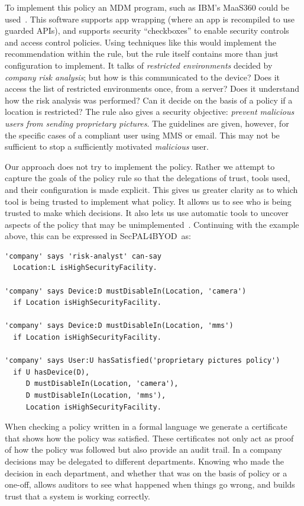\documentclass{llncs}
\newcommand{\AppPAL}[0]{SecPAL4BYOD}
\begin{document}
To implement this policy an \ac{MDM} program, such as IBM's MaaS360 could be used~\cite{_ibm_????}.
This software supports app wrapping (where an app is recompiled to use guarded APIs), and supports security ``checkboxes'' to enable security controls and access control policies.
Using techniques like this would implement the recommendation within the rule, but the rule itself contains more than just configuration to implement.
It talks of \emph{restricted environments} decided by \emph{company risk analysis}; but how is this communicated to the device?
Does it access the list of restricted environments once, from a server?
Does it understand how the risk analysis was performed?
Can it decide on the basis of a policy if a location is restricted?
The rule also gives a security objective: \emph{prevent malicious users from sending proprietary pictures}.
The guidelines are given, however, for the specific cases of a compliant user using MMS or email.
This may not be sufficient to stop a sufficiently motivated \emph{malicious} user.

Our approach does not try to implement the policy.
Rather we attempt to capture the goals of the policy rule so that the delegations of trust, tools used, and their configuration is made explicit.
This gives us greater clarity as to which tool is being trusted to implement what policy.
It allows us to see who is being trusted to make which decisions.
It also lets us use automatic tools to uncover aspects of the policy that may be unimplemented~\cite{hallett_specifying_2016}.
Continuing with the example above, this can be expressed in \AppPAL~as:

\begin{lstlisting}
'company' says 'risk-analyst' can-say
  Location:L isHighSecurityFacility.

'company' says Device:D mustDisableIn(Location, 'camera')
  if Location isHighSecurityFacility.

'company' says Device:D mustDisableIn(Location, 'mms')
  if Location isHighSecurityFacility.

'company' says User:U hasSatisfied('proprietary pictures policy')
  if U hasDevice(D),
     D mustDisableIn(Location, 'camera'),
     D mustDisableIn(Location, 'mms'),
     Location isHighSecurityFacility.
\end{lstlisting}

When checking a policy written in a formal language we generate a certificate that shows how the policy was satisfied.
These certificates not only act as proof of how the policy was followed but also provide an audit trail.
In a company decisions may be delegated to different departments.
Knowing who made the decision in each department, and whether that was on the basis of policy or a one-off, allows auditors to see what happened when things go wrong, and builds trust that a system is working correctly.
\end{document}
